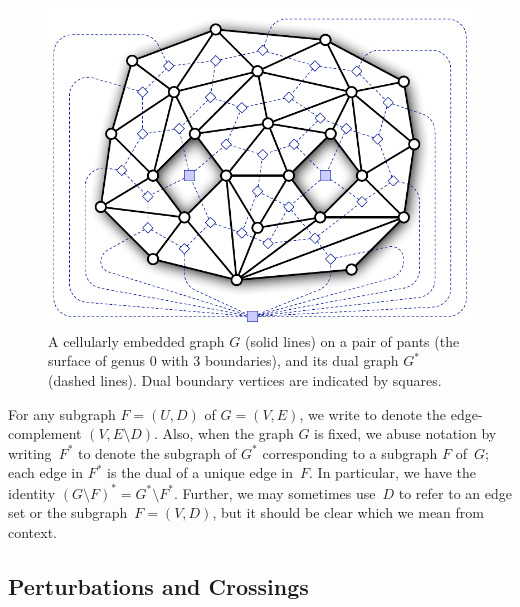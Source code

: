 \documentclass[letterpaper,review]{siamart190516}
\begin{document}
\begin{figure}[htb]
\centering
\includegraphics[scale=0.45]{Fig/pants}
\caption{A cellularly embedded graph $G$ (solid lines) on a pair of pants (the surface of genus 0 with 3 boundaries), and its dual graph $G^*$ (dashed lines).  Dual boundary vertices are indicated by squares.}
\label{fig:duality}
\end{figure}
 
For any subgraph $F = (U,D)$ of $G = (V,E)$, we write  to denote the edge-complement $(V, {E\setminus D})$.  Also, when the graph $G$ is fixed, we abuse notation by writing~$F^*$ to denote the subgraph of $G^*$ corresponding to a subgraph $F$ of~$G$; each edge in $F^*$ is the dual of a unique edge in~$F$.  In particular, we have the identity $(G\setminus F)^* = G^* \setminus F^*$.
Further, we may sometimes use~$D$ to refer to an edge set or the subgraph~$F = (V, D)$,
but it should be clear which we mean from context.

\subsection{Perturbations and Crossings}
\label{SS:perturb}
\end{document}
